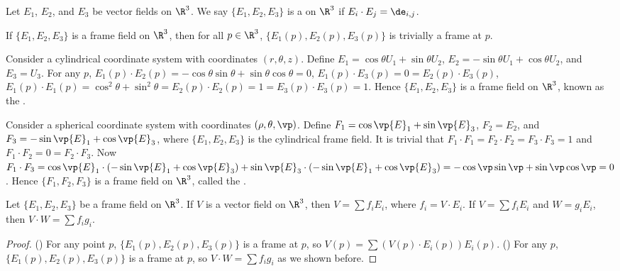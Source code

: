 \documentclass[10pt]{article}
\begin{document}
\begin{definition}
    Let ${E}_{1}$, ${E}_{2}$, and ${E}_{3}$ be vector fields on ${\R}^{3}$. We say $\{{E}_{1},{E}_{2},{E}_{3}\}$ is a  on ${\R}^{3}$ if ${E}_{i}\cdot{E}_{j}={\de}_{i,j}$.
\end{definition}
\par
If $\{{E}_{1},{E}_{2},{E}_{3}\}$ is a frame field on ${\R}^{3}$, then for all $p\in{\R}^{3}$, $\{{E}_{1}(p),{E}_{2}(p),{E}_{3}(p)\}$ is trivially a frame at $p$.
\begin{example}
    Consider a cylindrical coordinate system with coordinates $(r,\theta,z)$. Define ${E}_{1}=\cos\theta{U}_{1}+\sin\theta{U}_{2}$, ${E}_{2}=-\sin\theta{U}_{1}+\cos\theta{U}_{2}$, and ${E}_{3}={U}_{3}$. For any $p$, ${E}_{1}(p)\cdot{E}_{2}(p)=-\cos\theta\sin\theta+\sin\theta\cos\theta=0$, ${E}_{1}(p)\cdot{E}_{3}(p)=0={E}_{2}(p)\cdot{E}_{3}(p)$, ${E}_{1}(p)\cdot{E}_{1}(p)={\cos}^{2}\theta+{\sin}^{2}\theta={E}_{2}(p)\cdot{E}_{2}(p)=1={E}_{3}(p)\cdot{E}_{3}(p)=1$. Hence $\{{E}_{1},{E}_{2},{E}_{3}\}$ is a frame field on ${\R}^{3}$, known as the .
\end{example}
\begin{example}
    Consider a spherical coordinate system with coordinates $(\rho,\theta,\vp)$. Define ${F}_{1}=\cos\vp{E}_{1}+\sin\vp{E}_{3}$, ${F}_{2}={E}_{2}$, and ${F}_{3}=-\sin\vp{E}_{1}+\cos\vp{E}_{3}$, where $\{{E}_{1},{E}_{2},{E}_{3}\}$ is the cylindrical frame field. It is trivial that ${F}_{1}\cdot{F}_{1}={F}_{2}\cdot{F}_{2}={F}_{3}\cdot{F}_{3}=1$ and ${F}_{1}\cdot{F}_{2}=0={F}_{2}\cdot{F}_{3}$. Now ${F}_{1}\cdot{F}_{3}=\cos\vp{E}_{1}\cdot(-\sin\vp{E}_{1}+\cos\vp{E}_{3})+\sin\vp{E}_{3}\cdot(-\sin\vp{E}_{1}+\cos\vp{E}_{3})=-\cos\vp\sin\vp+\sin\vp\cos\vp=0$. Hence $\{{F}_{1},{F}_{2},{F}_{3}\}$ is a frame field on ${\R}^{3}$, called the .
\end{example}
\begin{proposition}
    Let $\{{E}_{1},{E}_{2},{E}_{3}\}$ be a frame field on ${\R}^{3}$. If $V$ is a vector field on ${\R}^{3}$, then $V=\sum{f}_{i}{E}_{i}$, where ${f}_{i}=V\cdot{E}_{i}$. If $V=\sum{f}_{i}{E}_{i}$ and $W={g}_{i}{E}_{i}$, then $V\cdot W=\sum{f}_{i}{g}_{i}$.
\end{proposition}
\begin{proof}
    () For any point $p$, $\{{E}_{1}(p),{E}_{2}(p),{E}_{3}(p)\}$ is a frame at $p$, so $V(p)=\sum(V(p)\cdot{E}_{i}(p)){E}_{i}(p)$. () For any $p$, $\{{E}_{1}(p),{E}_{2}(p),{E}_{3}(p)\}$ is a frame at $p$, so $V\cdot W=\sum{f}_{i}{g}_{i}$ as we shown before.
\end{proof}
\end{document}
